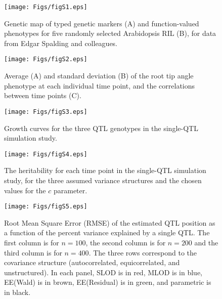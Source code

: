 \documentclass[letterpaper,twoside]{article}
\begin{document}
\addtocounter{page}{+1}

\begin{figure}[p]
\centerline{\texttt{[image: Figs/figS1.eps]}}

\caption{Genetic map of typed genetic markers (A)
     and function-valued phenotypes for five randomly selected
     Arabidopsis RIL (B), for data from Edgar Spalding and colleagues.}
\end{figure}

\clearpage

\begin{figure}[p]
\centerline{\texttt{[image: Figs/figS2.eps]}}
\vspace{1cm}

\caption{Average (A) and standard deviation (B) of the root tip angle phenotype at
  each individual time point, and the correlations between time points (C).}
\end{figure}

\clearpage

\begin{figure}[!ht]
\begin{center}
\texttt{[image: Figs/figS3.eps]}
\vspace{1cm}
 \caption{Growth curves for the three QTL genotypes in the single-QTL
   simulation study.}
\end{center}
\end{figure}

\clearpage

\begin{figure}[!ht]
\begin{center}
\texttt{[image: Figs/figS4.eps]}
\vspace{1cm}
 \caption{The heritability for each time point in the single-QTL
   simulation study, for the three assumed variance structures and the
   chosen values for the $c$ parameter.}
\end{center}
\end{figure}

\newpage

\begin{figure}[!ht]
\begin{center}
\texttt{[image: Figs/figS5.eps]}
\vspace{1cm}
 \caption{Root Mean Square Error (RMSE) of the estimated
   QTL position as a function of the percent variance explained by a
   single QTL.  The first column is for $n=100$, the second column is for $n=200$ and the third column is
   for $n=400$. The three rows correspond to the covariance structure
   (autocorrelated, equicorrelated, and unstructured).  In each panel,
   SLOD is in red, MLOD is in blue, EE(Wald) is in brown, EE(Residual)
   is in green, and parametric is in black.}
\end{center}
\end{figure}
\end{document}
